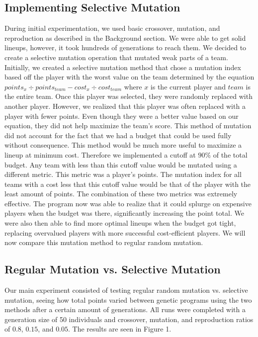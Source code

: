 \subsection{Implementing Selective Mutation}
\label{subsec:enum}
During initial experimentation, we used basic crossover, mutation, and reproduction as described in the Background section. We were able to get solid lineups, however, it took hundreds of generations to reach them. We decided to create a selective mutation operation that mutated weak parts of a team. Initially, we created a selective mutation method that chose a mutation index based off the player with the worst value on the team determined by the equation $points_x \div points_{team} - cost_x \div cost_{team}$ where $x$ is the current player and $team$ is the entire team. Once this player was selected, they were randomly replaced with another player. However, we realized that this player was often replaced with a player with fewer points. Even though they were a better value based on our equation, they did not help maximize the team's score. This method of mutation did not account for the fact that we had a budget that could be used fully without consequence. This method would be much more useful to maximize a lineup at minimum cost. Therefore we implemented a cutoff at $90\%$ of the total budget. Any team with less than this cutoff value would be mutated using a different metric. This metric was a player's points. The mutation index for all teams with a cost less that this cutoff value would be that of the player with the least amount of points. The combination of these two metrics was extremely effective. The program now was able to realize that it could splurge on expensive players when the budget was there, significantly increasing the point total. We were also then able to find more optimal lineups when the budget got tight, replacing overvalued players with more successful cost-efficient players. We will now compare this mutation method to regular random mutation.


\subsection{Regular Mutation vs. Selective Mutation}
\label{subsec:enum}
Our main experiment consisted of testing regular random mutation vs. selective mutation, seeing how total points varied between genetic programs using the two methods after a certain amount of generations. All runs were completed with a generation size of 50 individuals and crossover, mutation, and reproduction ratios of $0.8$, $0.15$, and $0.05$. The results are seen in Figure 1.



